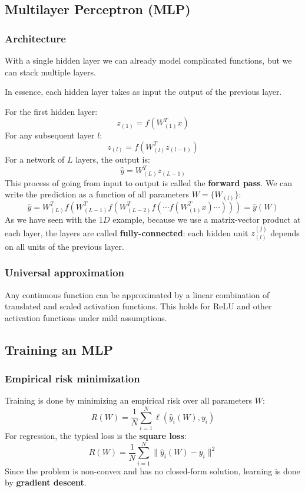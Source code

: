 \subsection{Multilayer Perceptron (MLP)}
\subsubsection{Architecture}
With a single hidden layer we can already model complicated functions, 
but we can stack multiple layers. 

In essence, each hidden layer takes as input the output of the previous layer.

For the first hidden layer:
\[
  z_{(1)} = f\left(W_{(1)}^T x\right)
\]
For any subsequent layer $l$:
\[
  z_{(l)} = f\left(W_{(l)}^T z_{(l-1)}\right)
\]
For a network of $L$ layers, the output is:
\[
  \hat{y} = W_{(L)}^T z_{(L-1)}
\]
This process of going from input to output is called the \textbf{forward pass}.
We can write the prediction as a function of all parameters $W = \{W_{(l)}\}$:
\[
  \hat{y} = W_{(L)}^T f\left(W_{(L-1)}^T f\left(W_{(L-2)}^T f\left(\cdots f\left(W_{(1)}^T x\right)\cdots\right)\right)\right) = \hat{y}(W)
\]
As we have seen with the $1D$ example, because we use a matrix-vector product at each layer, the layers are called 
\textbf{fully-connected}: each hidden unit $z_{(l)}^{(j)}$ depends on all units 
of the previous layer.

\vspace{-10pt}
\subsubsection{Universal approximation}
Any continuous function can be approximated by a linear combination of 
translated and scaled activation functions. This holds for ReLU and other 
activation functions under mild assumptions.

\subsection{Training an MLP}
\subsubsection{Empirical risk minimization}
Training is done by minimizing an empirical risk over all parameters $W$:
\[
  R(W) = \frac{1}{N} \sum_{i=1}^{N} \ell(\hat{y}_i(W), y_i)
\]
For regression, the typical loss is the \textbf{square loss}:
\[
  R(W) = \frac{1}{N} \sum_{i=1}^{N} \|\hat{y}_i(W) - y_i\|^2
\]
Since the problem is non-convex and has no closed-form solution, 
learning is done by \textbf{gradient descent}.

